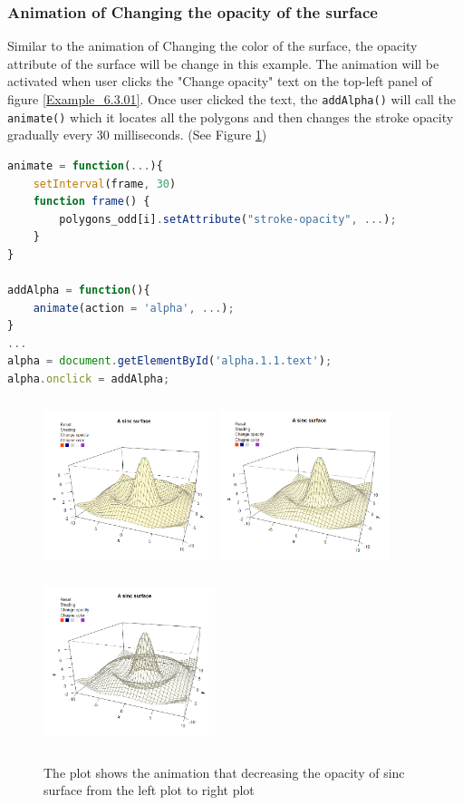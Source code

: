 \documentclass[paper=a4, fontsize=11pt]{report}
\begin{document}
\subsubsection*{Animation of Changing the opacity of the surface}
Similar to the animation of Changing the color of the surface, the opacity attribute of the surface will be change in this example. The animation will be activated when user clicks the "Change opacity" text on the top-left panel of figure \ref{Example_6.3.01}. Once user clicked the text, the \texttt{addAlpha()} will call the \texttt{animate()} which it locates all the polygons and then changes the stroke opacity gradually every 30 milliseconds. (See Figure \ref{Example_6.3.2})
\begin{lstlisting}[language = JavaScript]
animate = function(...){
    setInterval(frame, 30)
    function frame() {
        polygons_odd[i].setAttribute("stroke-opacity", ...);
    }
}

addAlpha = function(){
    animate(action = 'alpha', ...);
}
...
alpha = document.getElementById('alpha.1.1.text');
alpha.onclick = addAlpha; 
\end{lstlisting}

\begin{figure}[h]
	\begin{center}
		\includegraphics[height = 5cm, width = 5cm]{figure/svg/origin_1.PNG}
		\includegraphics[height = 5cm, width = 5cm]{figure/svg/opacity_2.PNG}
		\includegraphics[height = 5cm, width = 5cm]{figure/svg/opacity_3.PNG}
		\caption{The plot shows the animation that decreasing the opacity of sinc surface from the left plot to right plot}
		\label{Example_6.3.2}
	\end{center}
\end{figure}
\end{document}

